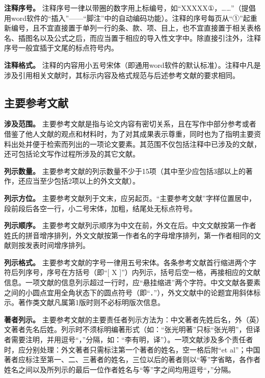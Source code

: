 \documentclass[singlesided]{Style/ucasthesis}%
\begin{document}
\textbf{注释序号。} 注释序号一律以带圈的数字用上标编号，如``XXXXX①，\ldots{}\ldots{}''（提倡用word软件的``插入''------``脚注''中的自动编码功能）。注释的序号每页从``①''起重新编号，且不宜直接置于单列一行的条、款、项、目上，也不宜直接置于相关表格名、插图名以及公式之后，而应当置于相应的导入性文字中。除直接引注外，注释序号一般宜插于文尾的标点符号内。

\textbf{注释格式。} 注释的内容用小五号宋体（即通用word软件的默认标准）。注释中凡是涉及引用相关文献时，其标示内容及格式规范与后述参考文献的要求相同。

\hypertarget{section-20}{%
\subsection{主要参考文献}\label{section-20}}

\textbf{涉及范围。} 主要参考文献是指与论文内容有密切关系，且在写作中部分参考或者借鉴了他人文献的观点和材料时，为了对其成果表示尊重，同时也为了指明主要资料出处并便于检索而列出的一项论文要素。其范围不仅包括注释中已涉及的文献，还可包括论文写作过程所涉及的其它文献。

\textbf{列示数量。} 主要参考文献的列示数量不少于15项（其中至少应包括3部以上的著作，还应当至少包括2项以上的外文文献）。

\textbf{列示方位。} 主要参考文献列于文末，应另起页。``主要参考文献''字样位置居中，段前段后各空一行，小二号宋体，加粗，结尾处无标点符号。

\textbf{列示顺序。} 主要参考文献列示顺序为中文在前，外文在后。中文文献按第一作者姓氏的拼音增序排列，外文文献按第一作者名的字母增序排列，第一作者相同的文献则按发表时间增序排列。

\textbf{列示格式。} 主要参考文献的字号一律用五号宋体。各条参考文献首行缩进两个字符后列序号，序号在方括号（即``{[} X {]}''）内列示，括号后空一格，再接相应的文献信息。一项文献的信息列示超过一行时，应``悬挂缩进''两个字符。中文文献各要素之间的小圆点宜用全角状态下的圆点符号（即``．''），外文文献中的论题宜用斜体标示。著作类文献凡属第1版时则不必标明版次信息。

\textbf{著者列示。} 主要参考文献的主要责任者列示方法为：中文著者先姓后名，外（英）文著者先名后姓。列示时不须标明编著形式（如：``张光明著''只标``张光明''，但译者需要注明，并用逗号``，''分隔，如：``李有明，译''）。一项文献涉及多个责任者时，应分别处理：外文著者只需标注第一个著者的姓名，空一格后附``et al''；中国著者应标注至第一、二、三著者的姓名，三位以后的著者则以``等''字省略，各作者姓名之间以及所列示的最后一位作者姓名与``等''字之间均用逗号``，''分隔。
\end{document}
